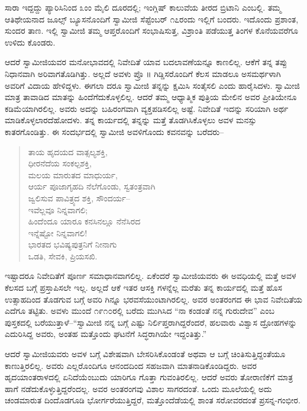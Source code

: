 ಸಾರಾ ಇದ್ದದ್ದು ಪ್ಯಾರಿಸಿನಿಂದ ೩ಂಂ ಮೈಲಿ ದೂರದಲ್ಲಿ; ಇಂಗ್ಲಿಷ್ ಕಾಲುವೆಯ ತೀರದ ಬ್ರಿಟಾನಿ ಎಂಬಲ್ಲಿ. ತಮ್ಮ ಆತಿಥೇಯನಾದ ಜೂಲ್ಸ್ ಬ್ಯೂಸನೊಂದಿಗೆ ಸ್ವಾಮೀಜಿ ಸೆಪ್ಟೆಂಬರ್ ೧೭ರಂದು ಇಲ್ಲಿಗೆ ಬಂದರು. ಇದೊಂದು ಪ್ರಶಾಂತ, ಸುಂದರ ತಾಣ. ಇಲ್ಲಿ ಸ್ವಾಮೀಜಿ ತಮ್ಮ ಆಪ್ತರೊಂದಿಗೆ ಸಂಭಾಷಿಸುತ್ತ, ವಿಶ್ರಾಂತಿ ಪಡೆಯುತ್ತ ತಿಂಗಳ ಕೊನೆಯವರೆಗೂ ಉಳಿದು ಕೊಂಡರು.

ಆದರೆ ಸ್ವಾಮೀಜಿಯವರ ಮನೋಭಾವದಲ್ಲಿ ನಿವೇದಿತೆ ಯಾವ ಬದಲಾವಣೆಯನ್ನೂ ಕಾಣಲಿಲ್ಲ. ಆಕೆಗೆ ತನ್ನ ತಪ್ಪು ನಿಧಾನವಾಗಿ ಅರಿವಾಗತೊಡಿಗಿತ್ತು. ಅಲ್ಲದೆ ಅವಳು ಪ್ರೊ ॥ ಗಿಡ್ಡಿಸರೊಂದಿಗೆ ಕೆಲಸ ಮಾಡಲೂ ಅಸಮರ್ಥಳಾಗಿ ಅವರಿಗೆ ವಿದಾಯ ಹೇಳಿದ್ದಳು. ಈಗಲಾ ದರೂ ಸ್ವಾಮೀಜಿ ತನ್ನನ್ನು ಕ್ಷಮಿಸಿ ಸಂತೈಸಲಿ ಎಂದು ಹಾರೈಸಿದಳು. ಸ್ವಾಮೀಜಿ ಮಾತ್ರ ತಾವಾಡಿದ ಮಾತನ್ನು ಹಿಂದೆಗೆದುಕೊಳ್ಳಲಿಲ್ಲ. ಆದರೆ ತಮ್ಮ ಆಧ್ಯಾತ್ಮಿಕ ಪುತ್ರಿಯ ಮೇಲಿನ ಅವರ ಪ್ರೀತಿಯೇನೂ ಕಡಿಮೆಯಾಗಿರಲಿಲ್ಲ. ಅವರು ಅದನ್ನು ಬಹಿರಂಗವಾಗಿ ವ್ಯಕ್ತಪಡಿಸಲಿಲ್ಲ ಅಷ್ಟೆ. ನಿವೇದಿತೆ ಇದನ್ನು ಸರಿಯಾಗಿ ಅರ್ಥ ಮಾಡಿಕೊಳ್ಳಲಾರದೆಹೋದಳು. ತನ್ನ ಕಾರ್ಯದಲ್ಲಿ ತನ್ನನ್ನು ಮತ್ತೆ ತೊಡಗಿಸಿಕೊಳ್ಳಲು ಅವಳ ಮನಸ್ಸು ಕಾತರಗೊಂಡಿತ್ತು. ಈ ಸಂದರ್ಭದಲ್ಲಿ ಸ್ವಾಮೀಜಿ ಅವಳಿಗೊಂದು ಕವನವನ್ನು ಬರೆದರು–

\begin{verse}
ತಾಯ ಹೃದಯದ ವಾತ್ಸಲ್ಯಶಕ್ತಿ,\\ಧೀರನೆದೆಯ ಸಂಕಲ್ಪಶಕ್ತಿ,\\ಮಲಯ ಮಾರುತದ ಮಾಧುರ್ಯ,\\ಆರ್ಯ ಪೂಜಾಗೃಹದಿ ನೆಲೆಗೊಂಡು, ಸ್ವತಂತ್ರವಾಗಿ\\ಜ್ವಲಿಸುವ ಪಾವಿತ್ರ್ಯದ ಶಕ್ತಿ, ಸೌಂದರ್ಯ–\\ಇವೆಲ್ಲವೂ ನಿನ್ನವಾಗಲಿ;\\ಹಿಂದೆಂದೂ ಯಾರೂ ಕನಸಿನಲ್ಲೂ ನೆನೆಸಿರದ\\ಇನ್ನೆಷ್ಟೋ ನಿನ್ನವಾಗಲಿ!\\ಭಾರತದ ಭವಿಷ್ಯಪುತ್ರನಿಗೆ ನೀನಾಗು\\ಒಡತಿ, ಸೇವಕಿ, ಪ್ರಿಯಸಖಿ.
\end{verse}

ಇಷ್ಟಾದರೂ ನಿವೇದಿತೆಗೆ ಪೂರ್ಣ ಸಮಾಧಾನವಾಗಲಿಲ್ಲ. ಏಕೆಂದರೆ ಸ್ವಾಮೀಜಿಯವರು ಈ ಅವಧಿಯಲ್ಲಿ ಮತ್ತೆ ಅವಳ ಕೆಲಸದ ಬಗ್ಗೆ ಪ್ರಸ್ತಾಪಿಸಲೇ ಇಲ್ಲ. ಅಲ್ಲದೆ ಆಕೆ ಇತರ ಆಸಕ್ತಿ ಗಳನ್ನೆಲ್ಲ ಮರೆತು ತನ್ನ ಕಾರ್ಯದಲ್ಲಿ ಮತ್ತೆ ಹೊಸ ಉತ್ಸಾಹದಿಂದ ತೊಡಗುವ ಬಗ್ಗೆ ಅವರಿ ಗಿನ್ನೂ ಭರವಸೆಯುಂಟಾಗಿರಲಿಲ್ಲ. ಅವರ ಅಂತರಂಗದ ಈ ಭಾವ ನಿವೇದಿತೆಯ ಎದೆಗೂ ತಟ್ಟಿತು. ಅವಳು ಮುಂದೆ ೧೯೧೦ರಲ್ಲಿ ಬರೆದು ಮುಗಿಸಿದ “ನಾ ಕಂಡಂತೆ ನನ್ನ ಗುರುದೇವ” ಎಂಬ ಪುಸ್ತಕದಲ್ಲಿ ಬರೆಯುತ್ತಾಳೆ–“ಸ್ವಾಮೀಜಿ ನನ್ನ ಬಗ್ಗೆ ಎಷ್ಟು ನಿರ್ಲಿಪ್ತರಾಗಿದ್ದರೆಂದರೆ, ಹಲವಾರು ವಿಶ್ವಾಸ ದ್ರೋಹಗಳನ್ನು ಎದುರಿಸಿದ್ದ ಅವರು, ಅಂತಹ ಮತ್ತೊಂದು ಘಟನೆಗೆ ಸಿದ್ಧರಾಗಿಯೇ ಇದ್ದಂತಿತ್ತು.”

ಆದರೆ ಸ್ವಾಮೀಜಿಯವರು ಅವಳ ಬಗ್ಗೆ ವಿಶೇಷವಾಗಿ ಬೇಸರಿಸಿಕೊಂಡಂತೆ ಅಥವಾ ಆ ಬಗ್ಗೆ ಚಿಂತಿಸುತ್ತಿದ್ದಂತೆಯೂ ಕಾಣುತ್ತಿರಲಿಲ್ಲ. ಅವರು ಎಲ್ಲರೊಂದಿಗೂ ಆನಂದದಿಂದ ಸಹಜವಾಗಿ ಮಾತನಾಡಿಕೊಂಡಿದ್ದರು. ಅವರ ಹೃದಯಾಂತರಾಳದಲ್ಲಿ ಏನಿದೆಯೆಂಬುದು ಯಾರಿಗೂ ಗೊತ್ತಾ ಗುವಂತಿರಲಿಲ್ಲ. ಆದರೆ ಅವರು ತೋರಾಣಿಕೆಗೆ ಮಾತ್ರ ಹಾಗೆ ನಡೆದುಕೊಳ್ಳುತ್ತಿದ್ದರೆಂದಲ್ಲ. ಅವರ ಅಂತರಂಗವು ವಿಶಾಲ ಸಾಗರದಂತೆ. ಒಂದು ಮೂಲೆಯಲ್ಲಿ ಅದು ಚಂಡಮಾರುತ ದಿಂದೊಡಗೂಡಿ ಭೋರ್ಗರೆಯುತ್ತಿದ್ದರೆ, ಮತ್ತೊಂದೆಡೆಯಲ್ಲಿ ಶಾಂತ ಸರೋವರದಂತೆ ಪ್ರಸನ್ನ-ಗಂಭೀರ.

